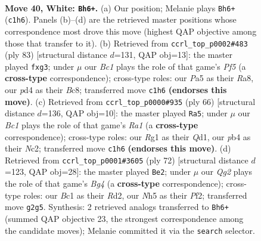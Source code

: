 \documentclass[11pt]{article}
\begin{document}
\clearpage

\begin{figure}[p]\centering
\begin{subfigure}{0.46\textwidth}\centering
\resizebox{\linewidth}{!}{%
\newchessgame
\chessboard[
  setfen={2b2k2/p1qn1r1p/1r3b2/P4P1N/1p1p4/1p6/R3P1Q1/1NBK2R1 w - - 2 40},
  showmover=false,
  pgfstyle=straightmove, color=movearrow, markmove={c1-h6}
]}
\caption{}
\end{subfigure}\hfill
\begin{subfigure}{0.46\textwidth}\centering
\resizebox{\linewidth}{!}{%
\newchessgame
\chessboard[
  setfen={r1b5/2q3k1/1p1p1ppn/1B1P3p/1QP1Pp2/2N3P1/r5P1/1RR3K1 b - - 1 42},
  showmover=false,
  pgfstyle=straightmove, color=movearrow, markmove={f4-g3}
]}
\caption{}
\end{subfigure}
\\[4pt]
\begin{subfigure}{0.46\textwidth}\centering
\resizebox{\linewidth}{!}{%
\newchessgame
\chessboard[
  setfen={4rq1k/2n1r2p/3pbb2/2p2p2/2B2P2/1P4RP/2NB2P1/R2Q3K w - - 1 34},
  showmover=false,
  pgfstyle=straightmove, color=movearrow, markmove={a1-a5}
]}
\caption{}
\end{subfigure}\hfill
\begin{subfigure}{0.46\textwidth}\centering
\resizebox{\linewidth}{!}{%
\newchessgame
\chessboard[
  setfen={r4rk1/7p/5ppP/1N2p1n1/2q1b1B1/4Q1P1/3R1P2/3R2K1 w - - 0 37},
  showmover=false,
  pgfstyle=straightmove, color=movearrow, markmove={g4-e2}
]}
\caption{}
\end{subfigure}
\caption{\textbf{Move 40, White: \texttt{Bh6+}.} (a) Our position; Melanie plays \texttt{Bh6+} (\texttt{c1h6}). Panels (b)--(d) are the retrieved master positions whose correspondence most drove this move (highest QAP objective among those that transfer to it). (b) Retrieved from \texttt{ccrl\_top\_p0002\#483} (ply 83) [structural distance $d$=131, QAP obj=13]: the master played \texttt{fxg3}; under $\mu$ our \emph{Bc1} plays the role of that game's \emph{Pf5} (a \textbf{cross-type} correspondence); cross-type roles: our \emph{P}a5 as their \emph{R}a8, our \emph{p}d4 as their \emph{B}c8; transferred move \texttt{c1h6} \textbf{(endorses this move)}. (c) Retrieved from \texttt{ccrl\_top\_p0000\#935} (ply 66) [structural distance $d$=136, QAP obj=10]: the master played \texttt{Ra5}; under $\mu$ our \emph{Bc1} plays the role of that game's \emph{Ra1} (a \textbf{cross-type} correspondence); cross-type roles: our \emph{R}g1 as their \emph{Q}d1, our \emph{p}b4 as their \emph{N}c2; transferred move \texttt{c1h6} \textbf{(endorses this move)}. (d) Retrieved from \texttt{ccrl\_top\_p0001\#3605} (ply 72) [structural distance $d$=123, QAP obj=28]: the master played \texttt{Be2}; under $\mu$ our \emph{Qg2} plays the role of that game's \emph{Bg4} (a \textbf{cross-type} correspondence); cross-type roles: our \emph{B}c1 as their \emph{R}d2, our \emph{N}h5 as their \emph{P}f2; transferred move \texttt{g2g5}. Synthesis: 2 retrieved analogs transferred to \texttt{Bh6+} (summed QAP objective 23, the strongest correspondence among the candidate moves); Melanie committed it via the \texttt{search} selector.}
\label{fig:thought-m78}
\end{figure}
\end{document}
